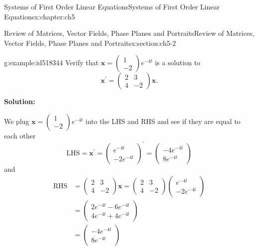 \documentclass[oneside,10pt,]{book}
\newcommand{\terminology}[1]{\textbf{#1}}
\numberwithin{equation}{section}
\numberwithin{equation}{section}
\newcommand{\amp}{&}
\begin{document}
\begin{chapterptx}{Systems of First Order Linear Equations}{}{Systems of First Order Linear Equations}{}{}{x:chapter:ch5}
\begin{sectionptx}{Review of Matrices, Vector Fields, Phase Planes and Portraits}{}{Review of Matrices, Vector Fields, Phase Planes and Portraits}{}{}{x:section:ch5-2}
\begin{example}{}{g:example:id518344}
Verify that \(\mathbf{x}=\left(\begin{array}{c}
1\\
-2
\end{array}\right)e^{-4t}\) is a solution to%
\begin{equation*}
\mathbf{x}^{\prime}=\left(\begin{array}{cc}
2 \amp 3\\
4 \amp -2
\end{array}\right)\mathbf{x}.
\end{equation*}
%
\par
\terminology{Solution:}%
\par
We plug \(\mathbf{x}=\left(\begin{array}{c}
1\\
-2
\end{array}\right)e^{-4t}\) into the LHS and RHS and see if they are equal to each other%
\begin{equation*}
\text{LHS}=\mathbf{x}^{\prime}=\left(\begin{array}{c}
e^{-4t}\\
-2e^{-4t}
\end{array}\right)^{\prime}=\left(\begin{array}{c}
-4e^{-4t}\\
8e^{-4t}
\end{array}\right)
\end{equation*}
and%
\begin{align*}
\text{RHS} \amp =\left(\begin{array}{cc}
2 \amp 3\\
4 \amp -2
\end{array}\right)\mathbf{x}=\left(\begin{array}{cc}
2 \amp 3\\
4 \amp -2
\end{array}\right)\left(\begin{array}{c}
e^{-4t}\\
-2e^{-4t}
\end{array}\right)\\
\amp =\left(\begin{array}{c}
2e^{-4t}-6e^{-4t}\\
4e^{-4t}+4e^{-4t}
\end{array}\right)\\
\amp =\left(\begin{array}{c}
-4e^{-4t}\\
8e^{-4t}
\end{array}\right)
\end{align*}

\end{example}
\end{sectionptx}
\end{chapterptx}
\end{document}
